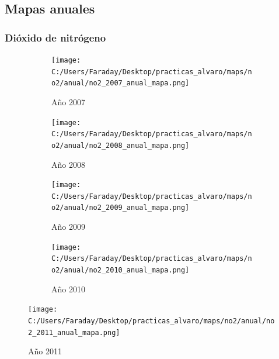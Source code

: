 \documentclass[12pt]{article}
\begin{document}
\subsection*{Mapas anuales}
%

\subsubsection*{Dióxido de nitrógeno}
%

\begin{figure}[H]
\centering
\begin{subfigure}[h]{0.45\textwidth}
\texttt{[image: C:/Users/Faraday/Desktop/practicas\_alvaro/maps/no2/anual/no2\_2007\_anual\_mapa.png]}
\caption{Año 2007}
\label{fig:map-ann-1-1}
\end{subfigure}
%
\begin{subfigure}[H]{0.45\textwidth}
\texttt{[image: C:/Users/Faraday/Desktop/practicas\_alvaro/maps/no2/anual/no2\_2008\_anual\_mapa.png]}
\caption{Año 2008}
\label{fig:map-ann-1-2}
\end{subfigure}
\caption{}
\end{figure}

\vspace{30mm}

\begin{figure}[H]
\centering
\begin{subfigure}[h]{0.45\textwidth}
\texttt{[image: C:/Users/Faraday/Desktop/practicas\_alvaro/maps/no2/anual/no2\_2009\_anual\_mapa.png]}
\caption{Año 2009}
\label{fig:map-ann-1-3}
\end{subfigure}
%
\begin{subfigure}[H]{0.45\textwidth}
\texttt{[image: C:/Users/Faraday/Desktop/practicas\_alvaro/maps/no2/anual/no2\_2010\_anual\_mapa.png]}
\caption{Año 2010}
\label{fig:map-ann-1-4}
\end{subfigure}
\caption{}
\end{figure}

\newpage

\begin{figure}[H]
\centering
\texttt{[image: C:/Users/Faraday/Desktop/practicas\_alvaro/maps/no2/anual/no2\_2011\_anual\_mapa.png]}
\label{fig:map-ann-1-5}
\caption{Año 2011}
\end{figure}

\vspace{30mm}
\end{document}
